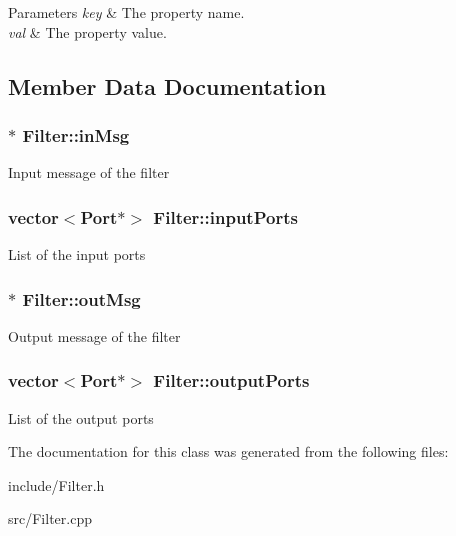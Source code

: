 \begin{DoxyParams}{Parameters}
{\em key} & The property name. \\
\hline
{\em val} & The property value. \\
\hline
\end{DoxyParams}


\subsection{Member Data Documentation}
\hypertarget{classFilter_ac938e02933af2dfb267895d260221d92}{
\subsubsection[{in\-Msg}]{$\ast$ Filter\-::in\-Msg\hspace{0.3cm}{\ttfamily [protected]}}}\label{classFilter_ac938e02933af2dfb267895d260221d92}
Input message of the filter \hypertarget{classFilter_ad09f0773f4b96d6f9ac143bb5b046d0b}{
\subsubsection[{input\-Ports}]{\setlength{\rightskip}{0pt plus 5cm}vector$<${\bf Port}$\ast$$>$ Filter\-::input\-Ports\hspace{0.3cm}{\ttfamily [protected]}}}\label{classFilter_ad09f0773f4b96d6f9ac143bb5b046d0b}
List of the input ports \hypertarget{classFilter_a5c1d2a7a7da437769281029505ef3054}{
\subsubsection[{out\-Msg}]{$\ast$ Filter\-::out\-Msg\hspace{0.3cm}{\ttfamily [protected]}}}\label{classFilter_a5c1d2a7a7da437769281029505ef3054}
Output message of the filter \hypertarget{classFilter_abf9b24a29561046ca09c65f5dde427ea}{
\subsubsection[{output\-Ports}]{\setlength{\rightskip}{0pt plus 5cm}vector$<${\bf Port}$\ast$$>$ Filter\-::output\-Ports\hspace{0.3cm}{\ttfamily [protected]}}}\label{classFilter_abf9b24a29561046ca09c65f5dde427ea}
List of the output ports 

The documentation for this class was generated from the following files\-:\begin{DoxyCompactItemize}
\item 
include/Filter.\-h\item 
src/Filter.\-cpp\end{DoxyCompactItemize}
